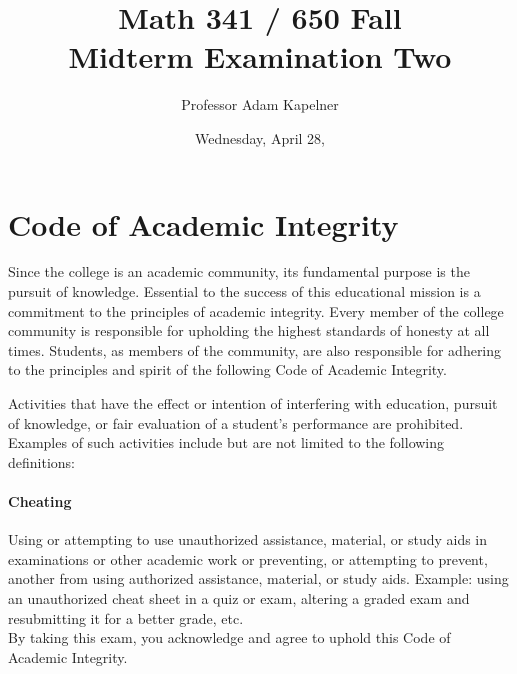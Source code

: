 \documentclass[12pt,landscape]{article}
\title{Math 341 / 650 Fall \the\year{} \\ Midterm Examination Two}
\author{Professor Adam Kapelner}
\date{Wednesday, April 28, \the\year{}}
\begin{document}
\maketitle


\thispagestyle{empty}

\section*{Code of Academic Integrity}

\footnotesize
Since the college is an academic community, its fundamental purpose is the pursuit of knowledge. Essential to the success of this educational mission is a commitment to the principles of academic integrity. Every member of the college community is responsible for upholding the highest standards of honesty at all times. Students, as members of the community, are also responsible for adhering to the principles and spirit of the following Code of Academic Integrity.

Activities that have the effect or intention of interfering with education, pursuit of knowledge, or fair evaluation of a student's performance are prohibited. Examples of such activities include but are not limited to the following definitions:

\paragraph{Cheating} Using or attempting to use unauthorized assistance, material, or study aids in examinations or other academic work or preventing, or attempting to prevent, another from using authorized assistance, material, or study aids. Example: using an unauthorized cheat sheet in a quiz or exam, altering a graded exam and resubmitting it for a better grade, etc.
\\

\noindent By taking this exam, you acknowledge and agree to uphold this Code of Academic Integrity. \\


\normalsize
\end{document}
